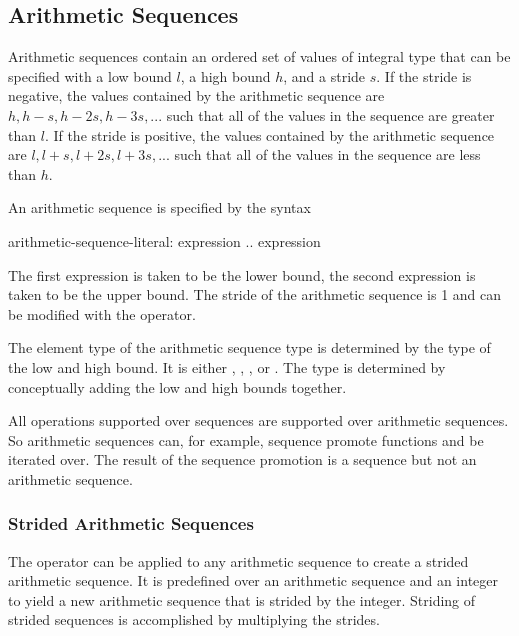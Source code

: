 \label{Ranges}

\subsection{Arithmetic Sequences}
\label{Arithmetic_Sequences}
Arithmetic sequences contain an ordered set of values of integral type
that can be specified with a low bound $l$, a high bound $h$, and a
stride $s$.  If the stride is negative, the values contained by the
arithmetic sequence are $h, h-s, h-2s, h-3s, ...$ such that all of the
values in the sequence are greater than $l$.  If the stride is
positive, the values contained by the arithmetic sequence are $l, l+s,
l+2s, l+3s, ...$ such that all of the values in the sequence are
less than $h$.

An arithmetic sequence is specified by the syntax
\begin{syntax}
arithmetic-sequence-literal:
  expression .. expression
\end{syntax}
The first expression is taken to be the lower bound, the second
expression is taken to be the upper bound.  The stride of the
arithmetic sequence is 1 and can be modified with the 
operator.

The element type of the arithmetic sequence type is determined by the
type of the low and high bound.  It is
either , , , or .  The
type is determined by conceptually adding the low and high bounds
together.

All operations supported over sequences are supported over arithmetic
sequences.  So arithmetic sequences can, for example, sequence promote
functions and be iterated over.  The result of the sequence promotion
is a sequence but not an arithmetic sequence.

\subsubsection{Strided Arithmetic Sequences}
\label{Strided_Arithmetic_Sequences}

The  operator can be applied to any arithmetic sequence to
create a strided arithmetic sequence.  It is predefined over an
arithmetic sequence and an integer to yield a new arithmetic sequence
that is strided by the integer.  Striding of strided sequences is
accomplished by multiplying the strides.

